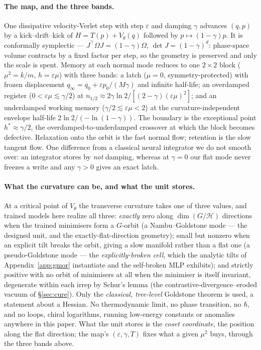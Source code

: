 \documentclass{article}
\begin{document}
\paragraph{The map, and the three bands.} One dissipative velocity-Verlet step with step $\varepsilon$ and damping $\gamma$ advances $(q,p)$ by a kick--drift--kick of $H=T(p)+V_\theta(q)$ followed by $p\mapsto(1-\gamma)p$. It is conformally symplectic --- $J^\top\Omega J=(1-\gamma)\Omega$, $\det J=(1-\gamma)^d$: phase-space volume contracts by a fixed factor per step, so the geometry is preserved and only the scale is spent. Memory at each normal mode reduces to one $2\times2$ block ($\mu^2=k/m$, $h=\varepsilon\mu$) with three bands: a latch ($\mu=0$, symmetry-protected) with frozen displacement $q_\infty=q_0+\varepsilon p_0/(M\gamma)$ and infinite half-life; an overdamped register ($0<\varepsilon\mu\lesssim\gamma/2$) at $n_{1/2}\approx2\gamma\ln2/[(2-\gamma)(\varepsilon\mu)^2]$; and an underdamped working memory ($\gamma/2\lesssim\varepsilon\mu<2$) at the curvature-independent envelope half-life $2\ln2/(-\ln(1-\gamma))$. The boundary is the exceptional point $h^*\approx\gamma/2$, the overdamped-to-underdamped crossover at which the block becomes defective. Relaxation onto the orbit is the fast normal flow; retention is the slow tangent flow. One difference from a classical neural integrator we do not smooth over: an integrator stores by \emph{not} damping, whereas at $\gamma=0$ our flat mode never freezes a write and any $\gamma>0$ gives an exact latch.

\paragraph{What the curvature can be, and what the unit stores.} At a critical point of $V_\theta$ the transverse curvature takes one of three values, and trained models here realize all three: \emph{exactly} zero along $\dim(G/\mathcal H)$ directions when the trained minimisers form a $G$-orbit (a Nambu--Goldstone mode --- the designed unit, and the exactly-flat-direction geometry); small but nonzero when an explicit tilt breaks the orbit, giving a slow manifold rather than a flat one (a pseudo-Goldstone mode --- the \emph{explicitly-broken cell}, which the analytic tilts of Appendix~\ref{app:gmor} instantiate and the self-broken MLP exhibits); and strictly positive with no orbit of minimisers at all when the minimiser is itself invariant, degenerate within each irrep by Schur's lemma (the contrastive-divergence--eroded vacuum of \S\ref{sec:cure}). Only the \emph{classical, tree-level} Goldstone theorem is used, a statement about a Hessian. No thermodynamic limit, no phase transition, no $\hbar$, and no loops, chiral logarithms, running low-energy constants or anomalies anywhere in this paper. What the unit stores is the \emph{coset coordinate}, the position along the flat direction; the map's $(\varepsilon,\gamma,T)$ fixes what a given $\mu^2$ buys, through the three bands above.
\end{document}
